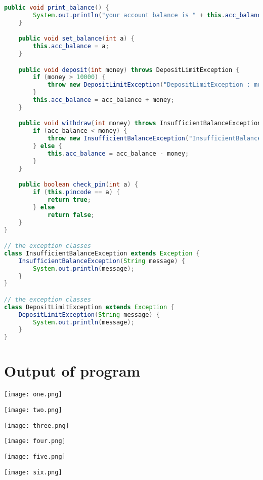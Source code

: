 \documentclass[]{article}
\begin{document}
\begin{lstlisting}[language=java, caption= Java Mini Project ]
    public void print_balance() {
        System.out.println("your account balance is " + this.acc_balance);
    }

    public void set_balance(int a) {
        this.acc_balance = a;
    }

    public void deposit(int money) throws DepositLimitException {
        if (money > 10000) {
            throw new DepositLimitException("DepositLimitException : more than 10000 at a time");
        }
        this.acc_balance = acc_balance + money;
    }

    public void withdraw(int money) throws InsufficientBalanceException {
        if (acc_balance < money) {
            throw new InsufficientBalanceException("InsufficientBalanceException : insufficient balance");
        } else {
            this.acc_balance = acc_balance - money;
        }
    }

    public boolean check_pin(int a) {
        if (this.pincode == a) {
            return true;
        } else
            return false;
    }
}

// the exception classes
class InsufficientBalanceException extends Exception {
    InsufficientBalanceException(String message) {
        System.out.println(message);
    }
}

// the exception classes
class DepositLimitException extends Exception {
    DepositLimitException(String message) {
        System.out.println(message);
    }
}


\end{lstlisting}


\newpage
\thispagestyle{others}

\section{Output of program}

\begin{center}
\texttt{[image: one.png]}
\end{center}
\begin{center}
\texttt{[image: two.png]}
\end{center}
\begin{center}
\texttt{[image: three.png]}
\end{center}
\begin{center}
\texttt{[image: four.png]}
\end{center}
\begin{center}
\texttt{[image: five.png]}
\end{center}
\begin{center}
\texttt{[image: six.png]}
\end{center}
\end{document}
